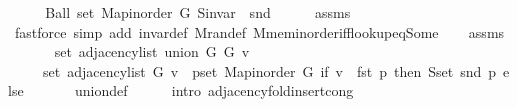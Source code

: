 \begin{isabellebody}
%
\isadelimproof
%
\endisadelimproof
%
\isatagproof
{}\isamarkupfalse%
\ {\isacharminus}{\kern0pt}\isanewline
\ \ \isamarkupfalse%
\ {\isachardoublequoteopen}Ball\ {\isacharparenleft}{\kern0pt}set\ {\isacharparenleft}{\kern0pt}Map{\isacharunderscore}{\kern0pt}inorder\ G{}{\isacharparenright}{\kern0pt}{\isacharparenright}{\kern0pt}\ {\isacharparenleft}{\kern0pt}S{\isachardot}{\kern0pt}invar\ {\isasymcirc}\ snd{\isacharparenright}{\kern0pt}{\isachardoublequoteclose}\isanewline
\ \ \ \ \isamarkupfalse%
\ assms{\isacharparenleft}{\kern0pt}{}{\isacharparenright}{\kern0pt}\isanewline
\ \ \ \ \isamarkupfalse%
\ {\isacharparenleft}{\kern0pt}fastforce\ simp\ add{\isacharcolon}{\kern0pt}\ invar{\isacharunderscore}{\kern0pt}def\ M{\isachardot}{\kern0pt}ran{\isacharunderscore}{\kern0pt}def\ M{\isachardot}{\kern0pt}mem{\isacharunderscore}{\kern0pt}inorder{\isacharunderscore}{\kern0pt}iff{\isacharunderscore}{\kern0pt}lookup{\isacharunderscore}{\kern0pt}eq{\isacharunderscore}{\kern0pt}Some{\isacharparenright}{\kern0pt}\isanewline
\ \ \isamarkupfalse%
\ assms{\isacharparenleft}{\kern0pt}{}{\isacharparenright}{\kern0pt}\isanewline
\ \ \isamarkupfalse%
\isanewline
\ \ \ \ {\isachardoublequoteopen}set\ {\isacharparenleft}{\kern0pt}adjacency{\isacharunderscore}{\kern0pt}list\ {\isacharparenleft}{\kern0pt}union\ G{}\ G{}{\isacharparenright}{\kern0pt}\ v{\isacharparenright}{\kern0pt}\ {\isacharequal}{\kern0pt}\isanewline
\ \ \ \ \ set\ {\isacharparenleft}{\kern0pt}adjacency{\isacharunderscore}{\kern0pt}list\ G{}\ v{\isacharparenright}{\kern0pt}\ {\isasymunion}\ {\isacharparenleft}{\kern0pt}{\isasymUnion}p{\isasymin}set\ {\isacharparenleft}{\kern0pt}Map{\isacharunderscore}{\kern0pt}inorder\ G{}{\isacharparenright}{\kern0pt}{\isachardot}{\kern0pt}\ if\ v\ {\isacharequal}{\kern0pt}\ fst\ p\ then\ S{\isachardot}{\kern0pt}set\ {\isacharparenleft}{\kern0pt}snd\ p{\isacharparenright}{\kern0pt}\ else\ {\isacharbraceleft}{\kern0pt}{\isacharbraceright}{\kern0pt}{\isacharparenright}{\kern0pt}{\isachardoublequoteclose}\isanewline
\ \ \ \ \isamarkupfalse%
\ union{\isacharunderscore}{\kern0pt}def\isanewline
\ \ \ \ \isamarkupfalse%
\ {\isacharparenleft}{\kern0pt}intro\ adjacency{\isacharunderscore}{\kern0pt}fold{\isacharunderscore}{\kern0pt}insert{\isacharunderscore}{\kern0pt}{}{\isacharunderscore}{\kern0pt}cong{\isacharparenright}{\kern0pt}\isanewline
\ \ \isamarkupfalse%

\end{isabellebody}
